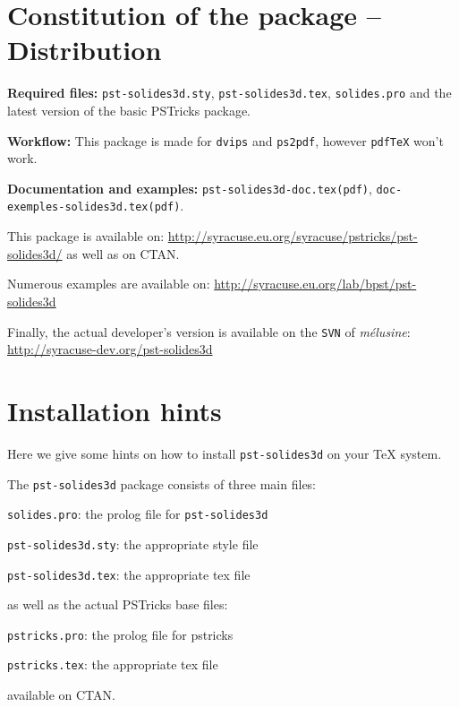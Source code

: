 \section{Constitution of the package -- Distribution}

\begin{compactitem}
\item \textbf{Required files:} \texttt{pst-solides3d.sty}, \texttt{pst-solides3d.tex},
\texttt{solides.pro} and the latest version of the basic PSTricks package.
\item \textbf{Workflow:} This package is made for \texttt{dvips} and \texttt{ps2pdf}, however
\texttt{pdf\TeX{}} won't work.
\item \textbf{Documentation and examples:} \texttt{pst-solides3d-doc.tex(pdf)},
\texttt{doc-exemples-solides3d.tex(pdf)}.
\end{compactitem}

This package is available on:
\url{http://syracuse.eu.org/syracuse/pstricks/pst-solides3d/}
as well as on CTAN.

Numerous examples are available on:
\url{http://syracuse.eu.org/lab/bpst/pst-solides3d}

Finally, the actual developer's version is available on the
\texttt{SVN} of \textit{m\'{e}lusine}:
\url{http://syracuse-dev.org/pst-solides3d}



\section{Installation hints}

Here we give some hints on how to install \texttt{pst-solides3d}
on your \TeX{} system.

The \texttt{pst-solides3d} package consists of three main files:
\begin{compactitem}
\item \texttt{solides.pro}: the prolog file for \texttt{pst-solides3d}
\item \texttt{pst-solides3d.sty}: the appropriate style file
\item \texttt{pst-solides3d.tex}: the appropriate tex file
\end{compactitem}
as well as the actual PSTricks base files:
\begin{compactitem}
\item \texttt{pstricks.pro}: the prolog file for pstricks
\item \texttt{pstricks.tex}: the appropriate tex file
\end{compactitem}
available on CTAN.

